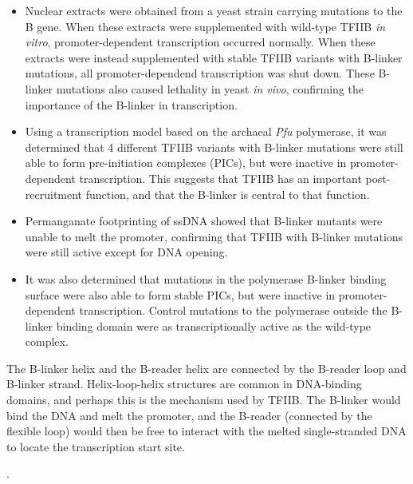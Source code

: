 \documentclass[a4paper, 10pt]{article}
\newcounter{prob_num}
\newcommand{\problem}{\vspace{20pt}\arabic{prob_num}.\stepcounter{prob_num}\par}
\begin{document}
\begin{itemize}
  \item Nuclear extracts were obtained from a yeast strain carrying mutations to the B gene. When these extracts were supplemented with wild-type TFIIB \textit{in vitro}, promoter-dependent transcription occurred normally. When these extracts were instead supplemented with stable TFIIB variants with B-linker mutations, all promoter-dependend transcription was shut down. These B-linker mutations also caused lethality in yeast \textit{in vivo}, confirming the importance of the B-linker in transcription.
  \item Using a transcription model based on the archaeal \textit{Pfu} polymerase, it was determined that 4 different TFIIB variants with B-linker mutations were still able to form pre-initiation complexes (PICs), but were inactive in promoter-dependent transcription. This suggests that TFIIB has an important post-recruitment function, and that the B-linker is central to that function.
  \item Permanganate footprinting of ssDNA showed that B-linker mutants were unable to melt the promoter, confirming that TFIIB with B-linker mutations were still active except for DNA opening.
  \item It was also determined that mutations in the polymerase B-linker binding surface were also able to form stable PICs, but were inactive in promoter-dependent transcription. Control mutations to the polymerase outside the B-linker binding domain were as transcriptionally active as the wild-type complex.
\end{itemize}

The B-linker helix and the B-reader helix are connected by the B-reader loop and B-linker strand. Helix-loop-helix structures are common in DNA-binding domains, and perhaps this is the mechanism used by TFIIB. The B-linker would bind the DNA and melt the promoter, and the B-reader (connected by the flexible loop) would then be free to interact with the melted single-stranded DNA to locate the transcription start site.

\clearpage
\problem
\end{document}
